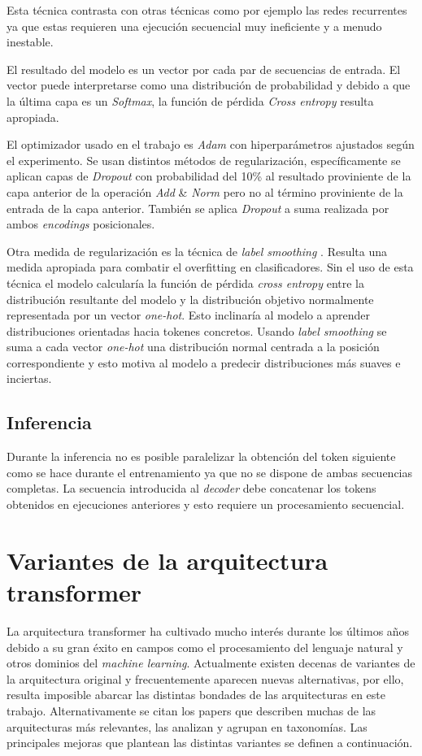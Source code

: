 Esta técnica contrasta con otras técnicas como por ejemplo las redes recurrentes ya que estas requieren una ejecución secuencial muy ineficiente y a menudo inestable.

El resultado del modelo es un vector por cada par de secuencias de entrada. El vector puede interpretarse como una distribución de probabilidad y debido a que la última capa es un \textit{Softmax}, la función de pérdida \textit{Cross entropy} resulta apropiada.

El optimizador usado en el trabajo es \textit{Adam} \cite{Kingma2014Dec} con hiperparámetros ajustados según el experimento. Se usan distintos métodos de regularización, específicamente se aplican capas de \textit{Dropout} \cite{Srivastava2014} con probabilidad del 10\% al resultado proviniente de la capa anterior de la operación \textit{Add} \& \textit{Norm} pero no al término proviniente de la entrada de la capa anterior. También se aplica \textit{Dropout} a suma realizada por ambos \textit{encodings} posicionales.

Otra medida de regularización es la técnica de \textit{label smoothing} \cite{Szegedy2015Dec}. Resulta una medida apropiada para combatir el overfitting en clasificadores. Sin el uso de esta técnica el modelo calcularía la función de pérdida \textit{cross entropy} entre la distribución resultante del modelo y la distribución objetivo normalmente representada por un vector \textit{one-hot}. Esto inclinaría al modelo a aprender distribuciones orientadas hacia tokenes concretos. Usando \textit{label smoothing} se suma a cada vector \textit{one-hot} una distribución normal centrada a la posición correspondiente y esto motiva al modelo a predecir distribuciones más suaves e inciertas.

\subsection{Inferencia}
Durante la inferencia no es posible paralelizar la obtención del token siguiente como se hace durante el entrenamiento ya que no se dispone de ambas secuencias completas. La secuencia introducida al \textit{decoder} debe concatenar los tokens obtenidos en ejecuciones anteriores y esto requiere un procesamiento secuencial.

\section{Variantes de la arquitectura transformer} \label{transfvariants}
La arquitectura transformer ha cultivado mucho interés durante los últimos años debido a su gran éxito en campos como el procesamiento del lenguaje natural y otros dominios del \textit{machine learning}. Actualmente existen decenas de variantes de la arquitectura original y frecuentemente aparecen nuevas alternativas, por ello, resulta imposible abarcar las distintas bondades de las arquitecturas en este trabajo. Alternativamente se citan los papers \cite{Tay2020Sep, Lin2021Jun} que describen muchas de las arquitecturas más relevantes, las analizan y agrupan en taxonomías. Las principales mejoras que plantean las distintas variantes se definen a continuación.

